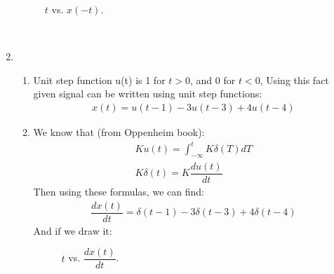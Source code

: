 \documentclass[10pt,a4paper, margin=1in]{article}
\begin{document}
\begin{enumerate}
\begin{figure}[ht!]
\begin{tikzpicture}[scale=0.90]
        \end{tikzpicture}
        \caption{$t$ vs. $x(-t)$.}
        \label{fig:q11}
    \end{figure} \\
\item
    \begin{enumerate}
    \item %
    Unit step function u(t) is 1 for $t> 0$, and 0 for $t < 0$, Using this fact given signal can be written using unit step functions:
    \begin{gather*}
        x(t) = u(t-1)-3u(t-3)+4u(t-4)
    \end{gather*}
    \item %
    We know that (from Oppenheim book):
    \begin{gather*}
        Ku(t) = \int_{-\infty}^{t} K\delta(T) dT \\
        K\delta(t)=K\dfrac{du(t)}{dt}
    \end{gather*}
    Then using these formulas, we can find:
    \begin{gather*}
        \dfrac{dx(t)}{dt} = \delta(t-1)-3\delta(t-3)+4\delta(t-4)
    \end{gather*}
    And if we draw it:
    \begin{figure} [ht!]
    \centering
    \caption{$t$ vs. $\dfrac{dx(t)}{dt}$.}
    \label{fig:q12}
\end{figure} \\
    \end{enumerate}

\end{enumerate}
\end{document}
